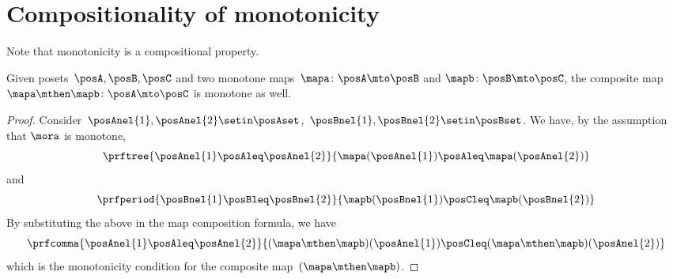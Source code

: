 
\section{Compositionality of monotonicity}
Note that monotonicity is a compositional property.
\begin{lemma}
    Given posets~$\posA,\posB,\posC$ and two monotone maps~$\mapa\colon \posA \mto \posB$ and $\mapb\colon \posB \mto \posC$, the composite map~$\mapa\mthen \mapb\colon \posA \mto \posC$ is monotone as well.
\end{lemma}
\begin{proof}
    Consider~$\posAnel{1},\posAnel{2} \setin \posAset$,~$\posBnel{1},\posBnel{2}\setin \posBset$.
    We have, by the assumption that $\mora$ is monotone,
    \begin{equation}
        \prftree{\posAnel{1}\posAleq \posAnel{2}}{\mapa(\posAnel{1})\posAleq \mapa(\posAnel{2})}
    \end{equation}
    and
    \begin{equation}
        \prfperiod{\posBnel{1}\posBleq \posBnel{2}}{\mapb(\posBnel{1})\posCleq \mapb(\posBnel{2})}
    \end{equation}
    By substituting the above in the map composition formula, we have
    \begin{equation}
        \prfcomma{\posAnel{1}\posAleq \posAnel{2} }{ (\mapa\mthen \mapb)(\posAnel{1}) \posCleq (\mapa\mthen \mapb)(\posAnel{2})}
    \end{equation}
    which is the monotonicity condition for the composite map~$(\mapa\mthen\mapb)$.
\end{proof}
